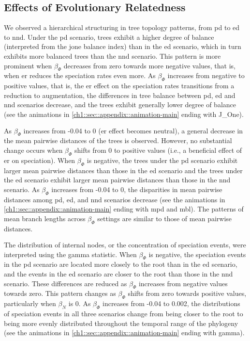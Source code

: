 {\subsection{Effects of Evolutionary Relatedness}
\label{ch1::sec::results::er_localness}
We observed a hierarchical structuring in tree topology patterns, from \acrshort{pd} to \acrshort{ed} to \acrshort{nnd}. Under the \acrshort{pd} scenario, trees exhibit a higher degree of balance (interpreted from the \acrshort{jone} balance index) than in the \acrshort{ed} scenario, which in turn exhibits more balanced trees than the \acrshort{nnd} scenario. This pattern is more prominent when $\beta_\varPhi$ decreases from zero towards more negative values, that is, when \acrshort{er} reduces the speciation rates even more. As $\beta_\varPhi$ increases from negative to positive values, that is, the \acrshort{er} effect on the speciation rates transitions from a reduction to augmentation, the differences in tree balance between \acrshort{pd}, \acrshort{ed} and \acrshort{nnd} scenarios decrease, and the trees exhibit generally lower degree of balance (see the animations in \autoref{ch1::sec::appendix::animation-main} ending with J\_One). 

As $\beta_\varPhi$ increases from -0.04 to 0 (\acrshort{er} effect becomes neutral), a general decrease in the mean pairwise distances of the trees is observed. However, no substantial change occurs when $\beta_\varPhi$ shifts from 0 to positive values (i.e., a beneficial effect of \acrshort{er} on speciation). When $\beta_\varPhi$ is negative, the trees under the \acrshort{pd} scenario exhibit larger mean pairwise distances than those in the \acrshort{ed} scenario and the trees under the \acrshort{ed} scenario exhibit larger mean pairwise distances than those in the \acrshort{nnd} scenario. As $\beta_\varPhi$ increases from -0.04 to 0, the disparities in mean pairwise distances among \acrshort{pd}, \acrshort{ed}, and \acrshort{nnd} scenarios decrease (see the animations in \autoref{ch1::sec::appendix::animation-main} ending with \acrshort{mpd} and \acrshort{mbl}). The patterns of mean branch lengths across $\beta_\varPhi$ settings are similar to those of mean pairwise distances.

The distribution of internal nodes, or the concentration of speciation events, were interpreted using the \acrshort{gamma} statistic. When $\beta_\varPhi$ is negative, the speciation events in the \acrshort{pd} scenario are located more closely to the root than in the \acrshort{ed} scenario, and the events in the \acrshort{ed} scenario are closer to the root than those in the \acrshort{nnd} scenario. These differences are reduced as $\beta_\varPhi$ increases from negative values towards zero. This pattern changes as $\beta_\varPhi$ shifts from zero towards positive values, particularly when $\beta_N$ is 0. As $\beta_\varPhi$ increases from -0.04 to 0.002, the distributions of speciation events in all three scenarios change from being closer to the root to being more evenly distributed throughout the temporal range of the phylogeny (see the animations in \autoref{ch1::sec::appendix::animation-main} ending with \acrshort{gamma}). 

}
